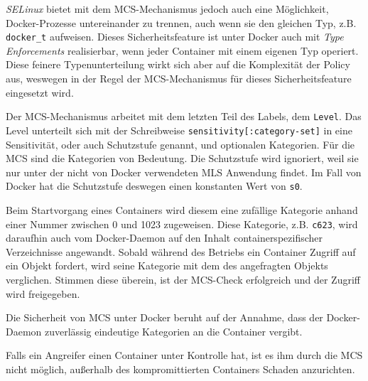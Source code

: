 \documentclass[../main.tex]{subfiles}
\begin{document}
{					\emph{SELinux} bietet mit dem MCS-Mechanismus jedoch auch eine Möglichkeit, Docker-Prozesse untereinander zu trennen, auch wenn sie den gleichen Typ, z.B. \texttt{docker\_t} aufweisen. Dieses Sicherheitsfeature ist unter Docker auch mit \emph{Type Enforcements} realisierbar, wenn jeder Container mit einem eigenen Typ operiert. Diese feinere Typenunterteilung wirkt sich aber auf die Komplexität der Policy aus, weswegen in der Regel der MCS-Mechanismus für dieses Sicherheitsfeature eingesetzt wird.

					Der MCS-Mechanismus arbeitet mit dem letzten Teil des Labels, dem \texttt{Level}. Das Level unterteilt sich mit der Schreibweise \texttt{sensitivity[:category-set]} in eine Sensitivität, oder auch Schutzstufe genannt, und optionalen Kategorien. Für die MCS sind die Kategorien von Bedeutung. Die Schutzstufe wird ignoriert, weil sie nur unter der nicht von Docker verwendeten \acrshort{MLS} Anwendung findet. Im Fall von Docker hat die Schutzstufe deswegen einen konstanten Wert von \texttt{s0}.

					Beim Startvorgang eines Containers wird diesem eine zufällige Kategorie anhand einer Nummer zwischen 0 und 1023 zugeweisen. Diese Kategorie, z.B. \texttt{c623}, wird daraufhin auch vom Docker-Daemon auf den Inhalt containerspezifischer Verzeichnisse angewandt. Sobald während des Betriebs ein Container Zugriff auf ein Objekt fordert, wird seine Kategorie mit dem des angefragten Objekts verglichen. Stimmen diese überein, ist der MCS-Check erfolgreich und der Zugriff wird freigegeben.

					Die Sicherheit von MCS unter Docker beruht auf der Annahme, dass der Docker-Daemon zuverlässig eindeutige Kategorien an die Container vergibt.

					Falls ein Angreifer einen Container unter Kontrolle hat, ist es ihm durch die MCS nicht möglich, außerhalb des kompromittierten Containers Schaden anzurichten.


}
\end{document}
